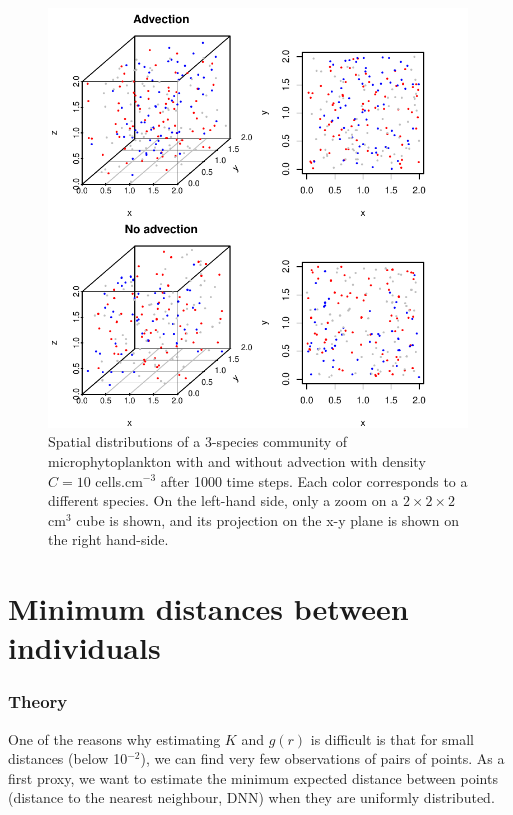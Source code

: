 \documentclass[english]{article}
\begin{document}
\begin{figure}[H]
\begin{centering}
\includegraphics[width=0.99\textwidth]{../code/figure/spatial_distribution_zoom_micro0}
\par\end{centering}
\caption{Spatial distributions of a 3-species community of microphytoplankton
with and without advection with density $C=10$ cells.cm$^{-3}$ after
1000 time steps. Each color corresponds to a different species. On
the left-hand side, only a zoom on a $2\times2\times2$ cm$^{3}$
cube is shown, and its projection on the x-y plane is shown on the
right hand-side. \label{fig:Spatial-distributions} }
\end{figure}

\section{Minimum distances between individuals}

\subsubsection*{Theory}

One of the reasons why estimating $K$ and $g(r)$ is difficult is
that for small distances (below 10$^{-2}$), we can find very few
observations of pairs of points. As a first proxy, we want to estimate
the minimum expected distance between points (distance to the nearest
neighbour, DNN) when they are uniformly distributed.
\end{document}
